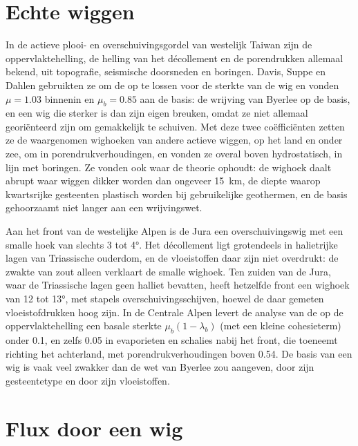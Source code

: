 \section{Echte wiggen}\label{sec:b3:orogenic-wedges:real}

In de actieve plooi- en overschuivingsgordel van westelijk Taiwan zijn de oppervlaktehelling, de
helling van het décollement en de porendrukken allemaal bekend, uit topografie,
seismische doorsneden en boringen. Davis, Suppe en Dahlen gebruikten ze om de
 op te lossen voor de sterkte van de wig en vonden $\mu = 1.03$
binnenin en $\mu_b = 0.85$ aan de basis: de wrijving van Byerlee op de basis, en een
wig die sterker is dan zijn eigen breuken, omdat ze niet allemaal georiënteerd zijn om
gemakkelijk te schuiven. Met deze twee coëfficiënten zetten ze de waargenomen wighoeken van andere
actieve wiggen, op het land en onder zee, om in porendrukverhoudingen, en vonden
ze overal boven hydrostatisch, in lijn met boringen. Ze vonden ook
waar de theorie ophoudt: de wighoek daalt abrupt waar wiggen dikker worden
dan ongeveer \qty{15}{km}, de diepte waarop kwartsrijke gesteenten plastisch worden
bij gebruikelijke geothermen, en de basis gehoorzaamt niet langer aan een wrijvingswet.

Aan het front van de westelijke Alpen is de Jura een overschuivingswig met een smalle
hoek van slechts 3 tot \ang{4}. Het décollement ligt grotendeels in halietrijke
lagen van Triassische ouderdom, en de vloeistoffen daar zijn niet overdrukt: de
zwakte van zout alleen verklaart de smalle wighoek. Ten zuiden van de Jura, waar de
Triassische lagen geen halliet bevatten, heeft hetzelfde front een wighoek van 12 tot
\ang{13}, met stapels overschuivingsschijven, hoewel de daar gemeten vloeistofdrukken
hoog zijn. In de Centrale Alpen levert de analyse van de  op de
oppervlaktehelling een basale sterkte $\mu_b(1 - \lambda_b)$ (met een kleine
cohesieterm) onder 0.1, en zelfs 0.05 in evaporieten en schalies nabij het front,
die toeneemt richting het achterland, met porendrukverhoudingen boven 0.54. De
basis van een wig is vaak veel zwakker dan de wet van Byerlee zou aangeven, door zijn
gesteentetype en door zijn vloeistoffen.

\section{Flux door een wig}\label{sec:b3:orogenic-wedges:flux}

